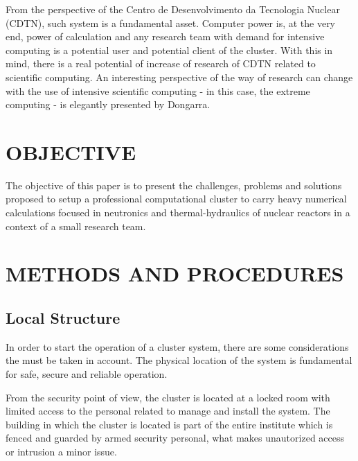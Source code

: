 \documentclass[twoside,a4paper,12pt,english]{inac17}
\begin{document}
From the perspective of the Centro de Desenvolvimento da Tecnologia Nuclear (CDTN), such system
is a fundamental asset. Computer power is, at the very end, power of calculation and any research
team with demand for intensive computing is a potential user and potential client of the cluster.
With this in mind, there is a real potential of increase of research of CDTN related to
scientific computing. An interesting perspective of the way of research can change with the
use of intensive scientific computing - in this case, the extreme computing - is elegantly
presented by Dongarra\cite{Dongarra2017}.



\section{OBJECTIVE}

The objective of this paper is to present the challenges, problems and solutions proposed
to setup a professional computational cluster to carry heavy numerical calculations focused in
neutronics and thermal-hydraulics of nuclear reactors in a
context of a small research team.



\section{METHODS AND PROCEDURES}

\subsection{Local Structure}

In order to start the operation of a cluster system, there are some considerations the must
be taken in account. The physical location of the system is fundamental for safe, secure and
reliable operation.

From the security point of view, the cluster is located at a locked room with limited access to
the personal related to manage and install the system. The building in which the cluster is located
is part of the entire institute which is fenced and guarded by armed security personal, what makes
unautorized access or intrusion a minor issue.
\end{document}
